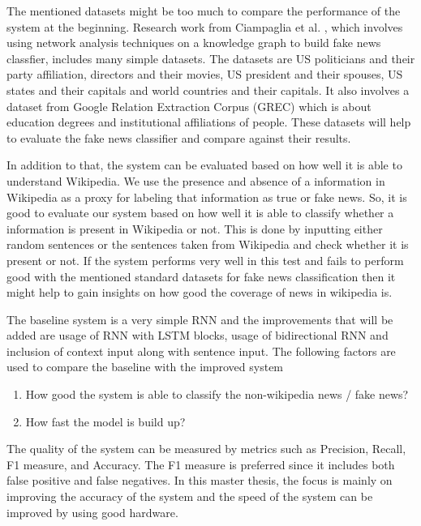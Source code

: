 \documentclass[a4paper, 11pt]{article}
\begin{document}
The mentioned datasets might be too much to compare the performance of the system at the beginning. Research work from Ciampaglia et al. \cite{Ciampaglia2015}, which involves using network analysis techniques on a knowledge graph to build fake news classfier, includes many simple datasets. The datasets are US politicians and their party affiliation, directors and their movies, US president and their spouses, US states and their capitals and world countries and their capitals. It also involves a dataset from Google Relation Extraction Corpus (GREC) which is about education degrees and institutional affiliations of people. These datasets will help to evaluate the fake news classifier and compare against their results.

In addition to that, the system can be evaluated based on how well it is able to understand Wikipedia. We use the presence and absence of a information in Wikipedia as a proxy for labeling that information as true or fake news. So, it is good to evaluate our system based on how well it is able to classify whether a information is present in Wikipedia or not. This is done by inputting either random sentences or the sentences taken from Wikipedia and check whether it is present or not. \color{red}If the system performs very well in this test and fails to perform good with the mentioned standard datasets for fake news classification then it might help to gain insights on how good the coverage of news in wikipedia is. \color{black}

The baseline system is a very simple RNN and the improvements that will be added are usage of RNN with LSTM blocks, usage of bidirectional RNN and inclusion of context input along with sentence input. The following factors are used to compare the baseline with the improved system
\begin{enumerate}
\item How good the system is able to classify the non-wikipedia news / fake news?
\item How fast the model is build up?
\end{enumerate}

The quality of the system can be measured by metrics such as Precision, Recall, F1 measure, and Accuracy. The F1 measure is preferred since it includes both false positive and false negatives. In this master thesis, the focus is mainly on improving the accuracy of the system and the speed of the system can be improved by using good hardware.

\newpage
\end{document}

